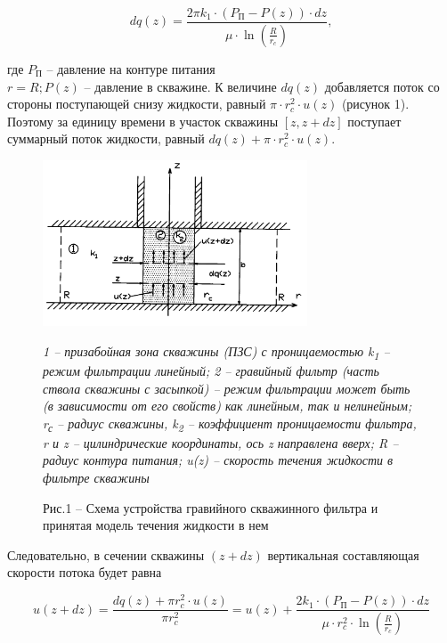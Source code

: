\begin{multicols}{2}
\begin{equation}
dq(z)=\frac{2\pi k_1\cdot(P_{\text{П}}-P(z))\cdot dz}{\mu\cdot \ln\left(\frac{R}{r_c}\right)},
\end{equation}

где $P_{\text{П}}$ -- давление на контуре питания \\$r=R; P(z)$ --
давление в скважине. К величине $dq(z)$ добавляется поток
со стороны поступающей снизу жидкости, равный $\pi\cdot r_c^2\cdot
u(z)$ (рисунок 1). Поэтому за единицу времени в участок скважины
$[z,z+dz]$ поступает суммарный поток жидкости, равный $dq(z)+\pi\cdot r_c^2\cdot u(z)$.
\end{multicols}

\begin{figure}[H]
	\centering
	\includegraphics[width=0.7\textwidth]{media/gorn/image17}
	\caption*{\normalfont\emph{1 -- призабойная зона скважины (ПЗС) с проницаемостью
k\textsubscript{1} -- режим фильтрации линейный; 2 -- гравийный фильтр
(часть ствола скважины с засыпкой) -- режим фильтрации может быть (в
зависимости от его свойств) как линейным, так и нелинейным;
r\textsubscript{с} -- радиус скважины, k\textsubscript{2} -- коэффициент
проницаемости фильтра, r и z -- цилиндрические координаты, ось z
направлена вверх; R -- радиус контура питания; u(z) -- скорость течения
жидкости в фильтре скважины}}
	\caption*{Рис.1 -- Схема устройства гравийного скважинного фильтра и принятая модель течения жидкости в нем}
\end{figure}

Следовательно, в сечении скважины $(z+dz)$ вертикальная
составляющая скорости потока будет равна

\begin{equation}
u(z+dz)=\frac{dq(z)+\pi r_c^2\cdot u(z)}{\pi r_c^2}=u(z)+\frac{2k_1\cdot (P_{\text{П}}-P(z))\cdot dz}{\mu\cdot r_c^2\cdot \ln\left(\frac{R}{r_c}\right)}
\end{equation}

